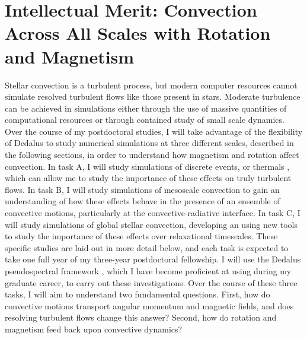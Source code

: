 \documentclass[aasms,11pt]{article}
\makeatletter
\renewcommand{\sectionmark}[1]{%
  \markboth{\ifnum \c@secnumdepth>\z@
      \thesection: \hskip 1em\relax
    \fi #1}{}}
\makeatother
\begin{document}
\section{Intellectual Merit: Convection Across All Scales with Rotation and Magnetism}
\sectionmark{Intellectual Merit}
\vspace{-9pt}

\label{sct:thermals}

Stellar convection is a turbulent process, but modern computer resources cannot simulate resolved turbulent flows like those present in stars.
Moderate turbulence can be achieved in simulations either through the use of massive quantities of computational resources or through contained study of small scale dynamics.
Over the course of my postdoctoral studies, I will take advantage of the flexibility of Dedalus to study numerical simulations at three different scales, described in the following sections, in order to understand how magnetism and rotation affect convection.
In task A, I will study simulations of discrete events, or thermals \citep[as in ][]{andersLB2019}, which can allow me to study the importance of these effects on truly turbulent flows.
In task B, I will study simulations of mesoscale convection \citep[as in ][]{anders&brown2017} to gain an understanding of how these effects behave in the presence of an ensemble of convective motions, particularly at the convective-radiative interface.
In task C, I will study simulations of global stellar convection, developing an using new tools to study the importance of these effects over relaxational timescales.
These specific studies are laid out in more detail below, and each task is expected to take one full year of my three-year postdoctoral fellowship.
I will use the Dedalus pseudospectral framework \citep{burns&all2019}, which I have become proficient at using during my graduate career, to carry out these investigations.
Over the course of these three tasks, I will aim to understand two fundamental questions.
First, how do convective motions transport angular momentum and magnetic fields, and does resolving turbulent flows change this answer?
Second, how do rotation and magnetism feed back upon convective dynamics?
\end{document}
